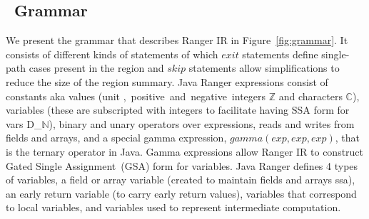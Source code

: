 \subsection{\tool\ Grammar}
%
We present the grammar that describes Ranger IR in Figure~\ref{fig:grammar}.
%
It consists of different kinds of statements of which
$exit$ statements define single-path cases present in the region and $skip$ statements allow simplifications to
reduce the size of the region summary.
%
Java Ranger expressions consist of constants aka values (unit \unit, positive and negative integers $\mathbb{Z}$ and
characters $\mathbb{C}$), variables (these are subscripted with integers to facilitate having SSA form for vars
D_$\mathbb{N}$), binary and unary operators over expressions, reads and writes from fields and arrays, and
a special gamma expression, $gamma(exp, exp, exp)$, that is the ternary operator in Java.
%
Gamma expressions allow Ranger IR to construct Gated Single Assignment~(GSA) form for variables.
%
Java Ranger defines 4 types of variables, a field or array variable (created to maintain fields and arrays ssa), an
early return variable (to carry early return values), variables that correspond to local variables, and variables used
to represent intermediate computation.
